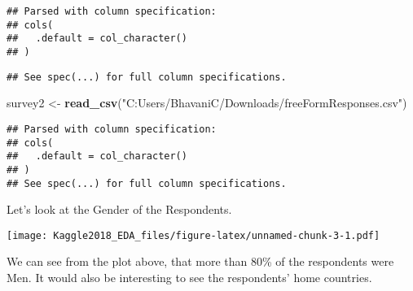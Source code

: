 \documentclass[]{article}
\newenvironment{Shaded}{\begin{snugshade}}{\end{snugshade}}
\newcommand{\KeywordTok}[1]{\textcolor[rgb]{0.13,0.29,0.53}{\textbf{{#1}}}}
\newcommand{\DataTypeTok}[1]{\textcolor[rgb]{0.13,0.29,0.53}{{#1}}}
\newcommand{\StringTok}[1]{\textcolor[rgb]{0.31,0.60,0.02}{{#1}}}
\newcommand{\NormalTok}[1]{{#1}}
\begin{document}
\begin{verbatim}
## Parsed with column specification:
## cols(
##   .default = col_character()
## )
\end{verbatim}

\begin{verbatim}
## See spec(...) for full column specifications.
\end{verbatim}

\begin{Shaded}
\begin{Highlighting}[]
\NormalTok{survey2 <-}\StringTok{ }\KeywordTok{read_csv}\NormalTok{(}\StringTok{"C:Users/BhavaniC/Downloads/freeFormResponses.csv"}\NormalTok{)}
\end{Highlighting}
\end{Shaded}

\begin{verbatim}
## Parsed with column specification:
## cols(
##   .default = col_character()
## )
## See spec(...) for full column specifications.
\end{verbatim}

Let's look at the Gender of the Respondents.

\begin{Shaded}
\end{Shaded}

\texttt{[image: Kaggle2018\_EDA\_files/figure-latex/unnamed-chunk-3-1.pdf]}

We can see from the plot above, that more than 80\% of the respondents
were Men. It would also be interesting to see the respondents' home
countries.
\end{document}
